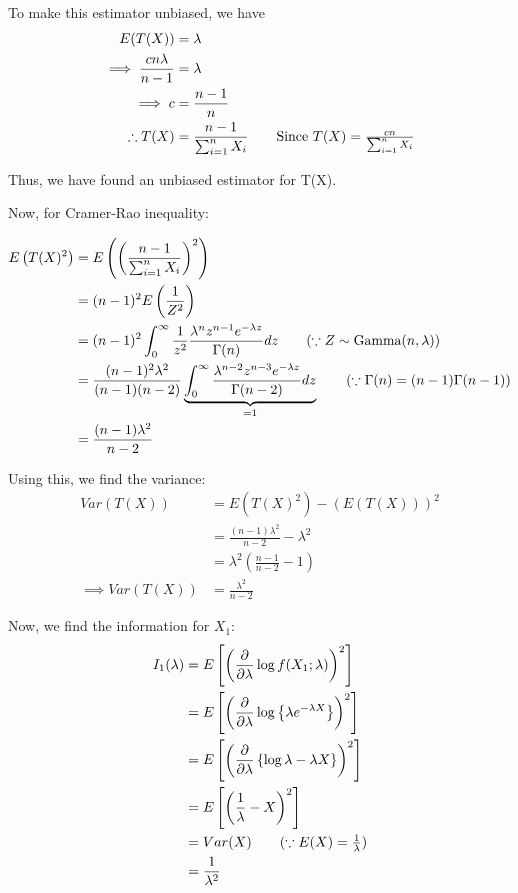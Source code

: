 \documentclass[12pt, oneside]{article}
\begin{document}
\begin{enumerate}
{  To make this estimator unbiased, we have
  \begin{align*}
    E(T(X)) &= \lambda \\
    \implies \frac{cn\lambda}{n-1} &= \lambda \\
    \implies c &= \frac{n-1}{n} \\
    \therefore T(X) &= \frac{n - 1}{\sum_{i=1}^{n} X_i} \tag*{Since \(T(X) = \frac{cn}{\sum_{i=1}^{n} X_i}\)}
  \end{align*}

  Thus, we have found an unbiased estimator for T(X).

  Now, for Cramer-Rao inequality:

  \begin{align*}
    E\left(T(X)^2\right) &= E\left(\left(\frac{n-1}{\sum_{i=1}^{n} X_i}\right)^2\right) \\
      &= (n - 1)^2 E\left(\frac{1}{Z^2}\right) \\
      &= (n - 1)^2 \int_{0}^{\infty} \frac{1}{z^2} \frac{\lambda^n z^{n-1} e^{-\lambda z}}{\Gamma(n)} dz \tag*{(\(\because Z \sim \text{Gamma}(n, \lambda)\))} \\
      &= \frac{(n - 1)^2 \lambda^2}{(n - 1)(n - 2)}\underbrace{\int_{0}^{\infty}\frac{\lambda^{n-2} z^{n-3} e^{-\lambda z}}{\Gamma(n-2)} dz}_{=1} \tag*{(\(\because \Gamma(n) = (n-1) \Gamma(n-1)\))} \\
      &= \frac{(n - 1) \lambda^2}{n - 2}
  \end{align*}

  Using this, we find the variance:
  \begin{align}
    Var(T(X)) &= E(T(X)^2) - (E(T(X)))^2 \nonumber\\
      &= \frac{(n - 1) \lambda^2}{n - 2} - \lambda^2 \nonumber\\
      &= \lambda^2 \left(\frac{n-1}{n-2} - 1\right) \nonumber\\
    \implies Var(T(X)) &= \frac{\lambda^2}{n - 2} \label{eq:1}
  \end{align}

  Now, we find the information for \(X_1\):
  \begin{align*}
    I_1(\lambda) &= E\left[\left(\frac{\partial}{\partial\lambda} \log f(X_1; \lambda)\right)^2\right] \\
      &= E\left[\left(\frac{\partial}{\partial\lambda} \log\left\{\lambda e^{-\lambda X}\right\}\right)^2\right] \\
      &= E\left[\left(\frac{\partial}{\partial\lambda} \left\{\log{\lambda} - \lambda X\right\} \right)^2\right] \\
      &= E\left[\left(\frac{1}{\lambda} - X\right)^2\right] \\
      &= Var(X) \tag*{(\(\because E(X) = \frac{1}{\lambda}\))}\\
      &= \frac{1}{\lambda^2}
  \end{align*}

}
\end{enumerate}
\end{document}
